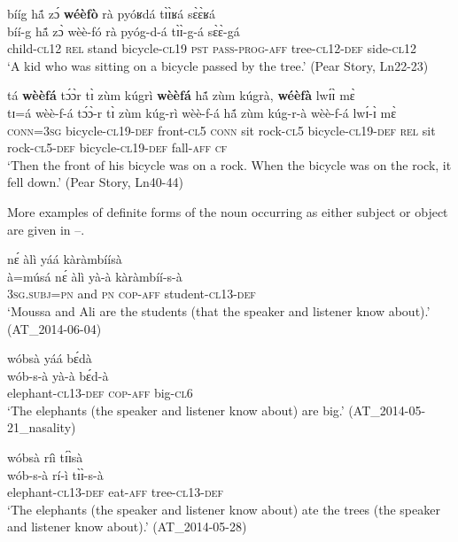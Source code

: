 \documentclass[output=paper]{langsci/langscibook}
\begin{document}
\ea\label{ex:teo:40}
\glll bííg h\'{ã} z\'ɔ \textbf{wéèfò} rà pyóʁdá t\`ɪ\`ɪʁá s\`ɛ\`ɛʁá\\
 bíí-g h\'{ã} z\`ɔ wèè-fó rà pyóg-d-á t\`ɪ\`ɪ-g-á s\`ɛ\`ɛ-gá\\
child-\textsc{cl}12 \textsc{rel} stand bicycle-\textsc{cl}19 \textsc{pst} \textsc{pass-prog-aff} tree-\textsc{cl12-def} side-\textsc{cl12}\\
\glt ‘A kid who was sitting on a bicycle passed by the tree.’ (Pear Story, Ln22-23)
\z

\ea\label{ex:teo:41}
\glll tá \textbf{wèèfá} t\'ɔ\`ɔr t\`ɪ zùm kúgrì \textbf{wèèfá} h\'{ã} zùm kúgrà, \textbf{wéèfà} lw\'ɪ\`ɪ m\`ɛ \\
 tɪ=á wèè-f-á t\'ɔ\`ɔ-r t\`ɪ zùm kúg-rì wèè-f-á h\'{ã} zùm kúg-r-à wèè-f-á lw\'ɪ-\`ɪ m\`ɛ\\
 \textsc{conn}=3\textsc{sg} bicycle-\textsc{cl19}-\textsc{def} front-\textsc{cl}5 \textsc{conn} sit rock-\textsc{cl}5 bicycle-\textsc{cl19}-\textsc{def} \textsc{rel} sit rock-\textsc{cl}5-\textsc{def} bicycle-\textsc{cl}19-\textsc{def} fall-\textsc{aff} \textsc{cf}\\
\glt ‘Then the front of his bicycle was on a rock. When the bicycle was on the rock, it fell down.’ (Pear Story, Ln40-44)
\z

More examples of definite forms of the noun occurring as either subject or object are given in –.

\ea\label{ex:teo:42}
 n\'ɛ àlì yáá kàràmbíísà\\
 à=músá n\'ɛ àlì yà-à kàràmbíí-s-à \\
\textsc{3sg.subj=pn} and \textsc{pn} \textsc{cop-aff} student-\textsc{cl13-def} \\
\glt ‘Moussa and Ali are the students (that the speaker and listener know about).’ (AT\_2014-06-04)
\z

\ea\label{ex:teo:43}
\glll wóbsà yáá b\'ɛdà\\
 wób-s-à yà-à b\'ɛd-à\\
elephant-\textsc{cl13-def} \textsc{cop-aff} big-\textsc{cl6}\\
\glt ‘The elephants (the speaker and listener know about) are big.’ (AT\_2014-05-21\_nasality)
\z

\ea\label{ex:teo:44}
\glll wóbsà ríì t\'ɪ\`ɪsà\\
 wób-s-à rí-ì t\`ɪ\`ɪ-s-à\\
elephant-\textsc{cl13-def} eat-\textsc{aff} tree-\textsc{cl13-def}\\
\glt ‘The elephants (the speaker and listener know about) ate the trees (the speaker and listener know about).’ (AT\_2014-05-28)
\z
\end{document}
